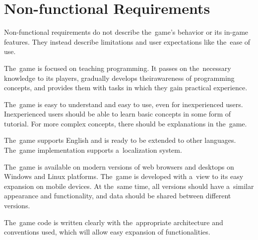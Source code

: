 \section{Non-functional Requirements}

Non-functional requirements do not describe the~game's behavior or its in-game features.
They instead describe limitations and user expectations like the~ease of use.

\begin{enumerate}[label=\textbf{N\arabic*}, ref=N\arabic*]
     The~game is focused on teaching programming. It passes on the~necessary knowledge to its players, gradually develops their\linebreak{}awareness of programming concepts, and provides them with tasks in which they gain practical experience.
    
     The~game is easy to understand and easy to use, even for inexperienced users.
    Inexperienced users should be able to learn basic concepts in some form of tutorial.
    For more complex concepts, there should be explanations in the~game.

     The~game supports English and is ready to be exten\-ded to other languages.
    The~game implementation supports a~localization system. 

     The~game is available on modern versions of web browsers and desktops on Windows and Linux platforms.
    The~game is developed with a~view to its easy expansion on mobile devices.
    At the~same time, all versions should have a~similar appearance and functionality, and data should be shared between different versions.

     The~game code is written clearly with the~appropriate architecture and conventions used, which will allow easy expansion of functionalities.    
\end{enumerate}
